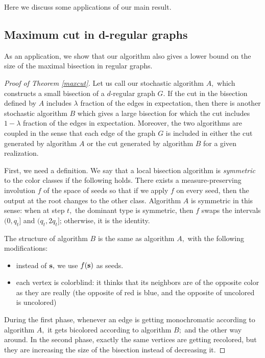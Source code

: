 \documentclass{article}
\theoremstyle{definition}
\begin{document}
Here we discuss some applications of our main result.

\subsection{Maximum cut in d-regular graphs}

 As an application, we show that our algorithm also gives a lower bound on the size of the maximal bisection in regular graphs. 
 
 \begin{proof}[Proof of Theorem \ref{maxcut}]
     
 Let us call our stochastic algorithm $A,$ which constructs a small bisection of a $d$-regular graph $G.$ If the cut in the bisection defined by $A$ includes $\lambda$ fraction of the edges in expectation, then there is another stochastic algorithm $B$ which gives a large bisection for which the cut includes $1-\lambda$ fraction of the edges in expectation. Moreover, the two algorithms are coupled in the sense that each edge of the graph $G$ is included in either the cut generated by algorithm $A$ or the cut generated by algorithm $B$ for a given realization.

 First, we need a definition. We say that a local bisection algorithm is \emph{symmetric} to the color classes if the following holds. There exists a measure-preserving involution $f$ of the space of seeds so that if we apply $f$ on every seed, then the output at the root changes to the other class. Algorithm $A$ is symmetric in this sense: when at step $t,$ the dominant type is symmetric, then $f$ swaps the intervals $(0,q_t]$ and $(q_t,2q_t]$; otherwise, it is the identity.

 The structure of algorithm $B$ is the same as algorithm $A,$ with the following modifications:
 \begin{itemize}
  \item instead of $\textbf s,$ we use $f(\textbf s)$ as seeds.
	\item each vertex is colorblind: it thinks that its neighbors are of the opposite color as they are really (the opposite of red is blue, and the opposite of uncolored is uncolored)
 \end{itemize}
 
 During the first phase, whenever an edge is getting monochromatic according to algorithm $A,$ it gets bicolored according to algorithm $B;$ and the other way around. In the second phase, exactly the same vertices are getting recolored, but they are increasing the size of the bisection instead of decreasing it.
 \end{proof}
\end{document}
